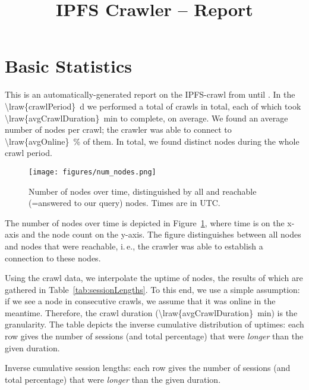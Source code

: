 \documentclass[10pt]{article}
\title{IPFS Crawler -- Report}
\makeatletter
\newcommand*{\ie}{i.\,e.\@\xspace}
\makeatother
\begin{document}
\maketitle

\section{Basic Statistics}
\label{sec:basic}

This is an automatically-generated report on the IPFS-crawl from  until .
In the \SI{\lraw{crawlPeriod}}{\day} we performed a total of  crawls in total, each of which took \SI{\lraw{avgCrawlDuration}}{\minute} to complete, on average.
We found an average number of  nodes per crawl; the crawler was able to connect to \SI{\lraw{avgOnline}}{\percent} of them.
In total, we found  distinct nodes during the whole crawl period.
%
\begin{figure}[ht]
\centering
  \texttt{[image: figures/num\_nodes.png]}
  \caption{Number of nodes over time, distinguished by all and reachable (=answered to our query) nodes. Times are in UTC.}
  \label{fig:num_nodes}
\end{figure}
%
The number of nodes over time is depicted in Figure~\ref{fig:num_nodes}, where time is on the x-axis and the node count on the y-axis.
The figure distinguishes between all nodes and nodes that were reachable, \ie, the crawler was able to establish a connection to these nodes.

Using the crawl data, we interpolate the uptime of nodes, the results of which are gathered in Table~\ref{tab:sessionLengths}.
To this end, we use a simple assumption: if we see a node in consecutive crawls, we assume that it was online in the meantime.
Therefore, the crawl duration (\SI{\lraw{avgCrawlDuration}}{\minute}) is the granularity.
The table depicts the inverse cumulative distribution of uptimes: each row gives the number of sessions (and total percentage) that were \emph{longer} than the given duration.
%
\begin{table}
  \center
  
  \caption{Inverse cumulative session lengths: each row gives the number of sessions (and total percentage) that were \emph{longer} than the given duration.}
  \label{tab:sessionLengths}
\end{table}
%
\end{document}
